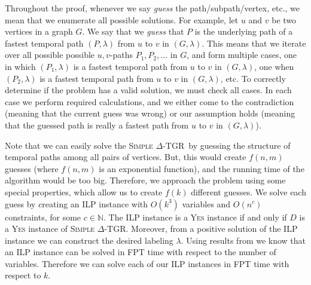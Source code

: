 \documentclass[11pt,a4paper]{article}
\theoremstyle{remark}
\theoremstyle{definition}
\newcommand{\deltaExact}{\textsc{Simple $\Delta$-TGR}}
\begin{document}
Throughout the proof, whenever we say \emph{guess} the path/subpath/vertex, etc., we mean that we enumerate all possible solutions.
For example, let $u$ and $v$ be two vertices in a graph $G$. 
We say that we \emph{guess} that $P$ is the underlying path of a fastest temporal path $(P, \lambda)$ from $u$ to $v$ in $(G, \lambda)$.
This means that we iterate over all possible possible $u,v$-paths $P_1, P_2, \dots $ in $G$, 
and form multiple cases, 
one in which $(P_1, \lambda)$ is a fastest temporal path from $u$ to $v$ in $(G,\lambda)$,
one when $(P_2, \lambda)$ is a fastest temporal path from $u$ to $v$ in $(G,\lambda)$, etc.
To correctly determine if the problem has a valid solution, we must check all cases.
In each case we perform required calculations, 
and we either come to the contradiction (meaning that the current guess was wrong) 
or our assumption holds (meaning that the guessed path is really a fastest path from $u$ to $v$ in $(G, \lambda)$).

Note that we can easily solve the \deltaExact\ by guessing the structure of temporal paths among all pairs of vertices.
But, this would create $f(n,m)$ guesses (where $f(n,m)$ is an exponential function), and the running time of the algorithm would be too big.
Therefore, we approach the problem using some special properties, which allow us to create $f(k)$ different guesses.
We solve each guess by creating an ILP instance with $O(k^3)$ variables and $O(n^c)$ constraints, for some $c \in \mathbb{N}$.
The ILP instance is a \textsc{Yes} instance if and only if $D$ is a \textsc{Yes} instance of \deltaExact.
Moreover, from a positive solution of the ILP instance we can construct the desired labeling $\lambda$.
Using results from \cite{Lenstra1983Integer} we know that an ILP instance can be solved in FPT time with respect to the number of variables.
Therefore we can solve each of our ILP instances in FPT time with respect to $k$.
\end{document}
